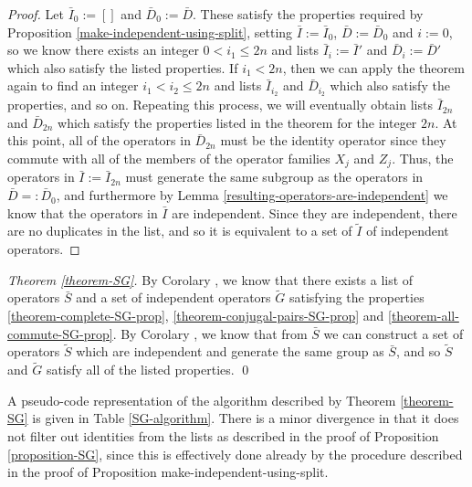 \documentclass[twocolumn,showpacs,preprintnumbers,amsmath,amssymb,nofootinbib,pra,floatfix]{revtex4}
\newenvironment{remark}[1][Remark]{\begin{trivlist}
\item[\hskip \labelsep {\bfseries #1}]}{\end{trivlist}}
\begin{document}
\begin{proof}
Let $\bar I_0 := []$ and $\bar D_0 := \bar D$.  These satisfy the properties required by Proposition \ref{make-independent-using-split}, setting $\bar I:=\bar I_0$, $\bar D:=\bar D_0$ and $i:=0$, so we know there exists an integer $0<i_1\le 2n$ and lists $\bar I_i:=\bar I'$ and $\bar D_i:=\bar D'$ which also satisfy the listed properties.  If $i_1<2n$, then we can apply the theorem again to find an integer $i_1<i_2\le 2n$ and lists $\bar I_{i_2}$ and $\bar D_{i_2}$ which also satisfy the properties, and so on.  Repeating this process, we will eventually obtain lists $\bar I_{2n}$ and $\bar D_{2n}$ which satisfy the properties listed in the theorem for the integer $2n$.  At this point, all of the operators in $\bar D_{2n}$ must be the identity operator since they commute with all of the members of the operator families $X_j$ and $Z_j$.  Thus, the operators in $\bar I := \bar I_{2n}$ must generate the same subgroup as the operators in $\bar D =: \bar D_0$, and furthermore by Lemma \ref{resulting-operators-are-independent} we know that the operators in $\bar I$ are independent.  Since they are independent, there are no duplicates in the list, and so it is equivalent to a set of $\tilde I$ of independent operators.
\end{proof}
\begin{proof}[Theorem \ref{theorem-SG}]
By Corolary \label{corolary-SG}, we know that there exists a list of operators $\bar S$ and a set of independent operators $\tilde G$ satisfying the properties \ref{theorem-complete-SG-prop}, \ref{theorem-conjugal-pairs-SG-prop} and \ref{theorem-all-commute-SG-prop}.  By Corolary \label{corolary-make-independent-using-split}, we know that from $\bar S$ we can construct a set of operators $\tilde S$ which are independent and generate the same group as $\bar S$, and so $\tilde S$ and $\tilde G$ satisfy all of the listed properties. \qed
\end{proof}
\begin{remark}
A pseudo-code representation of the algorithm described by Theorem \ref{theorem-SG} is given in Table  \ref{SG-algorithm}.  There is a minor divergence in that it does not filter out identities from the lists as described in the proof of Proposition \ref{proposition-SG}, since this is effectively done already by the procedure described in the proof of Proposition {make-independent-using-split}.
\end{remark}
\end{document}
